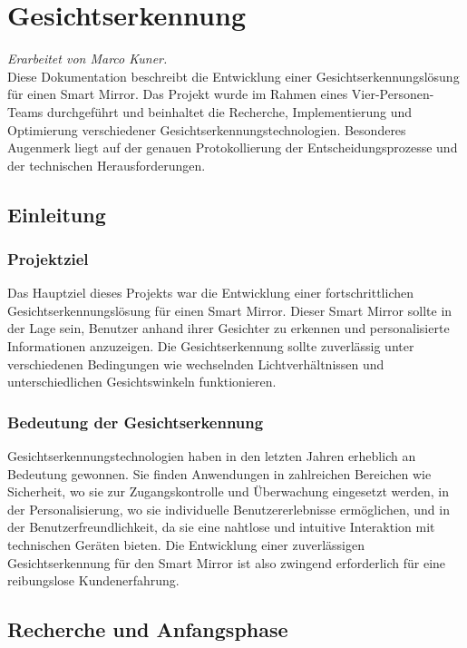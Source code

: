 \chapter{Gesichtserkennung}
\textit{Erarbeitet von Marco Kuner.} \\

\noindent
Diese Dokumentation beschreibt die Entwicklung einer Gesichtserkennungslösung für einen Smart Mirror. Das Projekt wurde im Rahmen eines Vier-Personen-Teams durchgeführt und beinhaltet die Recherche, Implementierung und Optimierung verschiedener Gesichtserkennungstechnologien. Besonderes Augenmerk liegt auf der genauen Protokollierung der Entscheidungsprozesse und der technischen Herausforderungen.

\section{Einleitung}

\subsection{Projektziel}
Das Hauptziel dieses Projekts war die Entwicklung einer fortschrittlichen Gesichtserkennungslösung für einen Smart Mirror. Dieser Smart Mirror sollte in der Lage sein, Benutzer anhand ihrer Gesichter zu erkennen und personalisierte Informationen anzuzeigen. Die Gesichtserkennung sollte zuverlässig unter verschiedenen Bedingungen wie wechselnden Lichtverhältnissen und unterschiedlichen Gesichtswinkeln funktionieren.

\subsection{Bedeutung der Gesichtserkennung}
Gesichtserkennungstechnologien haben in den letzten Jahren erheblich an Bedeutung gewonnen. Sie finden Anwendungen in zahlreichen Bereichen wie Sicherheit, wo sie zur Zugangskontrolle und Überwachung eingesetzt werden, in der Personalisierung, wo sie individuelle Benutzererlebnisse ermöglichen, und in der Benutzerfreundlichkeit, da sie eine nahtlose und intuitive Interaktion mit technischen Geräten bieten. Die Entwicklung einer zuverlässigen Gesichtserkennung für den Smart Mirror ist also zwingend erforderlich für eine reibungslose Kundenerfahrung.



\section{Recherche und Anfangsphase}

